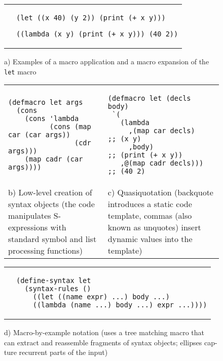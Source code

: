 \documentclass[10pt,journal,a4paper]{IEEEtran}
\begin{document}
\begin{figure*}[t]
\begin{listing}
\normalsize

\begin{tabular}{p{4.0cm} p{15cm}}\\
 &
\begin{verbatim}
(let ((x 40) (y 2)) (print (+ x y)))

((lambda (x y) (print (+ x y))) (40 2))
\end{verbatim}
\end{tabular}

\begin{center}
a) Examples of a macro application and a macro expansion of the \small \texttt{let} \normalsize macro
\end{center}

\begin{tabular}{p{8.5cm} p{8.5cm}}\\
\begin{verbatim}
(defmacro let args
  (cons
    (cons 'lambda
          (cons (map car (car args))
                (cdr args)))
    (map cadr (car args))))
\end{verbatim}
&
\begin{verbatim}
(defmacro let (decls body)
 `(
   (lambda
     ,(map car decls)   ;; (x y)
     ,body)             ;; (print (+ x y))
   ,@(map cadr decls))) ;; (40 2)
\end{verbatim}\\
b) Low-level creation of syntax objects (the code manipulates S-expressions
with standard symbol and list processing functions)
&
c) Quasiquotation \cite{bawden99}
(backquote introduces a static code template, commas (also known as
unquotes) insert dynamic values into the template)
\end{tabular}

\begin{tabular}{p{3.5cm} p{13.5cm}}\\
 &
\begin{verbatim}
(define-syntax let
  (syntax-rules ()
    ((let ((name expr) ...) body ...)
    ((lambda (name ...) body ...) expr ...))))
\end{verbatim}
\end{tabular}

\begin{adjustwidth}{4cm}{0pt}
d) Macro-by-example notation \cite{kohlbecker87} (uses a tree matching macro that\\
can extract and reassemble fragments of syntax objects; ellipses cap-\\ture
recurrent parts of the input)
\end{adjustwidth}


\end{listing}
\end{figure*}
\end{document}

